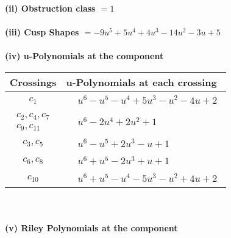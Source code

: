 \documentclass[1p]{elsarticle_modified}
\theoremstyle{definition}
\begin{document}
\flushleft \textbf{(ii) Obstruction class $= 1$}\\~\\
\flushleft \textbf{(iii) Cusp Shapes $= -9 u^5+5 u^4+4 u^3-14 u^2-3 u+5$}\\~\\
\newpage\renewcommand{\arraystretch}{1}
\flushleft \textbf{(iv) u-Polynomials at the component}\newline \\
\begin{tabular}{m{50pt}|m{274pt}}
Crossings & \hspace{64pt}u-Polynomials at each crossing \\
\hline $$\begin{aligned}c_{1}\end{aligned}$$&$\begin{aligned}
&u^6- u^5- u^4+5 u^3- u^2-4 u+2
\end{aligned}$\\
\hline $$\begin{aligned}c_{2},c_{4},c_{7}\\c_{9},c_{11}\end{aligned}$$&$\begin{aligned}
&u^6-2 u^4+2 u^2+1
\end{aligned}$\\
\hline $$\begin{aligned}c_{3},c_{5}\end{aligned}$$&$\begin{aligned}
&u^6- u^5+2 u^3- u+1
\end{aligned}$\\
\hline $$\begin{aligned}c_{6},c_{8}\end{aligned}$$&$\begin{aligned}
&u^6+u^5-2 u^3+u+1
\end{aligned}$\\
\hline $$\begin{aligned}c_{10}\end{aligned}$$&$\begin{aligned}
&u^6+u^5- u^4-5 u^3- u^2+4 u+2
\end{aligned}$\\
\hline
\end{tabular}\\~\\
\newpage\renewcommand{\arraystretch}{1}
\flushleft \textbf{(v) Riley Polynomials at the component}\newline \\
\end{document}
